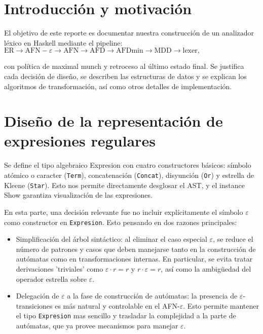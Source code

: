 \section*{Introducción y motivación}

El objetivo de este reporte es documentar nuestra construcción de un analizador léxico en Haskell mediante el pipeline: $ \text{ER} \rightarrow \text{AFN}-{\varepsilon} \rightarrow \text{AFN} \rightarrow \text{AFD} \rightarrow \text{AFDmin} \rightarrow \text{MDD} \rightarrow \text{lexer}, $ 

con política de maximal munch y retroceso al último estado final. Se justifica cada decisión de diseño, se describen las estructuras de datos y se explican los algoritmos de transformación, así como otros detalles de implementación.

\section{Diseño de la representación de expresiones regulares}

Se define el tipo algebraico Expresion con cuatro constructores básicos: símbolo atómico o caracter (\texttt{Term}), concatenación (\texttt{Concat}), disyunción (\texttt{Or}) y estrella de Kleene (\texttt{Star}). Esto nos permite directamente desglosar el AST, y el instance Show garantiza visualización de las expresiones.

En esta parte, una decisión relevante fue no incluir explícitamente el símbolo $\varepsilon$ como constructor en \texttt{Expresion}. Esto pensando en dos razones principales:

\begin{itemize}
    \item Simplificación del árbol sintáctico: al eliminar el caso especial $\varepsilon$, se reduce el número de patrones y casos que deben manejarse tanto en la construcción de autómatas como en transformaciones internas. En particular, se evita tratar derivaciones 'triviales' como $\varepsilon \cdot r = r$ y $r \cdot \varepsilon = r$, así como la ambigüedad del operador estrella sobre $\varepsilon$.
    \item Delegación de $\varepsilon$ a la fase de construcción de autómatas: la presencia de $\varepsilon$-transiciones es más natural y controlable en el AFN-$\varepsilon$. Esto permite mantener el tipo \texttt{Expresion} mas sencillo y trasladar la complejidad a la parte de autómatas, que ya provee mecanismos para manejar $\varepsilon$.
\end{itemize}